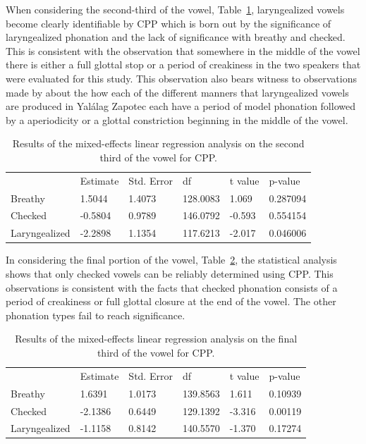 \documentclass[12pt, letterpaper]{article}
\providecommand{\lsptoprule}{\midrule\toprule}
\providecommand{\lspbottomrule}{\bottomrule\midrule}
\begin{document}
When considering the second-third of the vowel, Table~\ref{tab:CPP_Second}, laryngealized vowels become clearly identifiable by CPP which is born out by the significance of laryngealized phonation and the lack of significance with breathy and checked. This is consistent with the observation that somewhere in the middle of the vowel there is either a full glottal stop or a period of creakiness in the two speakers that were evaluated for this study. This observation also bears witness to observations made by \citet{avelinoAcousticElectroglottographicAnalyses2010} about the how each of the different manners that laryngealized vowels are produced in Yalálag Zapotec each have a period of model phonation followed by a aperiodicity or a glottal constriction beginning in the middle of the vowel. 

\begin{table}[!h]
	\centering
	\caption{Results of the mixed-effects linear regression analysis on the second third of the vowel for CPP. }
	\label{tab:CPP_Second}
	 \begin{tabular}{llllll}
	  \lsptoprule
						&  Estimate  & Std. Error & df & t value & p-value \\
	  	Breathy   		&  1.5044   &  1.4073 & 128.0083 &  1.069 & 0.287094 \\
		Checked    		& -0.5804   &  0.9789 & 146.0792 & -0.593 & 0.554154 \\
		Laryngealized	& -2.2898   &  1.1354 & 117.6213 & -2.017 & 0.046006 \\
	  \lspbottomrule
	 \end{tabular}
\end{table}

In considering the final portion of the vowel, Table~\ref{tab:CPP_Third}, the statistical analysis shows that only checked vowels can be reliably determined using CPP. This observations is consistent with the facts that checked phonation consists of a period of creakiness or full glottal closure at the end of the vowel. The other phonation types fail to reach significance.

\begin{table}[!h]
	\centering
	\caption{Results of the mixed-effects linear regression analysis on the final third of the vowel for CPP. }
	\label{tab:CPP_Third}
	 \begin{tabular}{llllll}
	  \lsptoprule
						&  Estimate  & Std. Error & df & t value & p-value \\
	  	Breathy   		&  1.6391   &  1.0173  & 139.8563 &  1.611 & 0.10939 \\
		Checked    		& -2.1386   &  0.6449  & 129.1392 & -3.316 & 0.00119 \\
		Laryngealized	& -1.1158   &  0.8142  & 140.5570 & -1.370 & 0.17274\\
	  \lspbottomrule
	 \end{tabular}
\end{table}
\end{document}
